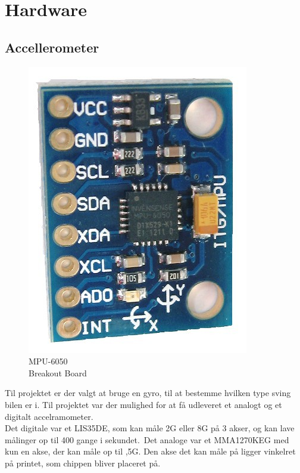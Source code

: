 \section{Hardware}

\subsection{Accellerometer}

\begin{figure}
	\begin{minipage}{.3\textwidth}\centering
		\includegraphics[scale=0.2]{Billeder/mpu-6050.jpg}
		\caption{MPU-6050\\Breakout Board}
		\label{fig:MPU-6050-Breakout}
	\end{minipage}
\end{figure}

Til projektet er der valgt at bruge en gyro, til at bestemme hvilken type sving bilen er i. Til projektet var der mulighed for at få udleveret et analogt og et digitalt accelramometer.
\\Det digitale var et LIS35DE, som kan måle \textpm 2G eller \textpm 8G på 3 akser, og kan lave målinger op til 400 gange i sekundet.\ Det analoge var et MMA1270KEG med kun en akse, der kan måle op til ,5G. Den akse det kan måle på ligger vinkelret på printet, som chippen bliver placeret på.
\linebreak


